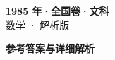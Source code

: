 \documentclass[zihao=-4, a4paper]{ctexart}
\begin{document}
\begin{center}
  {\Large\bfseries 1985 年·全国卷·文科}\\[4pt]
  {\large 数学 · 解析版}
\end{center}
\medskip
{}

\clearpage
{}
\begin{center}{\Large\bfseries 参考答案与详细解析}\end{center}
\medskip

\end{document}
